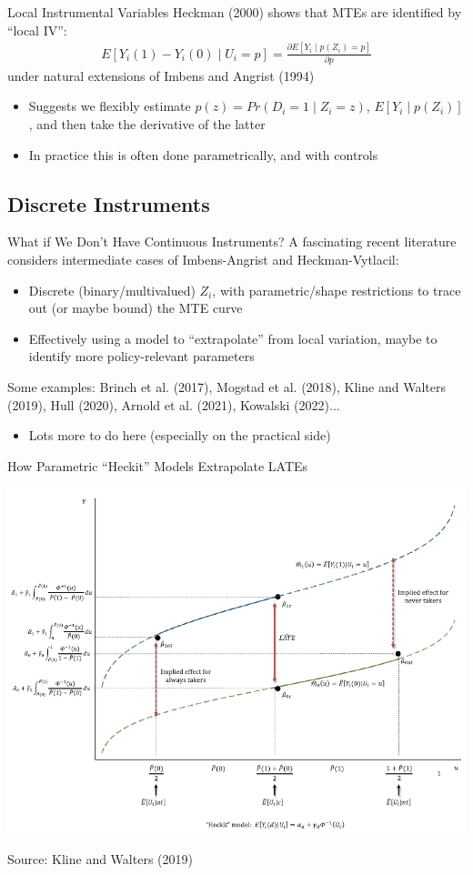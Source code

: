 \documentclass{beamer}
\begin{document}
\begin{frame}{Local Instrumental Variables}
Heckman (2000) shows that MTEs are identified by ``local IV'':\smallskip
\begin{align*}
E[Y_i(1)-Y_i(0)\mid U_i=p]=\frac{\partial E[Y_i\mid p(Z_i)=p]}{\partial p}
\end{align*}
under natural extensions of Imbens and Angrist (1994)\smallskip\pause{}
\begin{itemize}
\item Suggests we flexibly estimate $p(z)=Pr(D_i=1\mid Z_i=z)$, $E[Y_i\mid p(Z_i)]$, and then take the derivative of the latter\smallskip
\item In practice this is often done parametrically, and with controls
\end{itemize}

\end{frame}

\subsection{Discrete Instruments}
\begin{frame}{What if We Don't Have Continuous Instruments?}
A fascinating recent literature considers intermediate cases of Imbens-Angrist and Heckman-Vytlacil:\smallskip
\begin{itemize}
\item Discrete (binary/multivalued) $Z_i$, with parametric/shape restrictions to trace out (or maybe bound) the MTE curve\smallskip
\item Effectively using a model to ``extrapolate'' from local variation, maybe to identify more policy-relevant parameters
\end{itemize}\medskip\pause{}
Some examples: Brinch et al. (2017),  Mogstad et al. (2018), Kline and Walters (2019), Hull (2020), Arnold et al. (2021), Kowalski (2022)...\smallskip
\begin{itemize}
\item Lots more to do here (especially on the practical side)
\end{itemize}
\end{frame}

\begin{frame}{How Parametric ``Heckit'' Models Extrapolate LATEs}
\vspace{-0.3cm}
\begin{center}
\includegraphics[scale=0.4]{./lecture_includes/kline_walters.png}
\end{center}
Source: Kline and Walters (2019) 
\end{frame}
\end{document}
